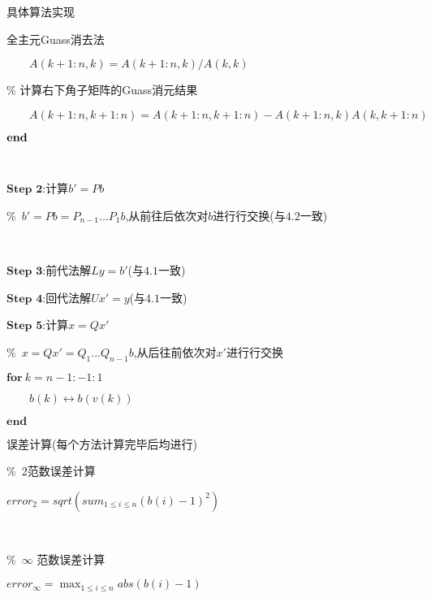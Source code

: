 \documentclass{article}
\begin{document}
\begin{section}{具体算法实现}
\begin{subsection}{全主元Guass消去法}
{    $\qquad A(k+1:n,k) = A(k+1:n,k)/A(k,k)$
         
    \% 计算右下角子矩阵的Guass消元结果

    $\qquad A(k+1:n,k+1:n) = A(k+1:n,k+1:n) - A(k+1:n,k)A(k,k+1:n)$

    $\bf{end}$

    \ 

    \noindent $\textbf{Step\ 2:}$计算$b'=Pb$

    \%\ $b'=Pb=P_{n-1}...P_1b$,从前往后依次对$b$进行行交换(与$4.2$一致)

    \ 

    \noindent $\textbf{Step\ 3:}$前代法解$Ly=b'$(与$4.1$一致)

    \noindent $\textbf{Step\ 4:}$回代法解$Ux'=y$(与$4.1$一致)
        
    \noindent $\textbf{Step\ 5:}$计算$x=Qx'$

    \%\ $x=Qx'=Q_1...Q_{n-1}b$,从后往前依次对$x'$进行行交换

    $\textbf{for}\ k=n-1:-1:1$

    $\qquad b(k)\leftrightarrow b(v(k))$ 

    $\textbf{end}$
    }
    \end{subsection}    
    \begin{subsection}{误差计算(每个方法计算完毕后均进行)}
        \small{\%\ 2范数误差计算

        $ error_2 = sqrt(sum_{1\leq i\leq n}(b(i)-1)^2)$

        \ 

        \%\ $\infty$ 范数误差计算

        $ error_{\infty} = \max_{1\leq i\leq n}abs(b(i)-1)$}
    \end{subsection}
\end{section}
\end{document}
